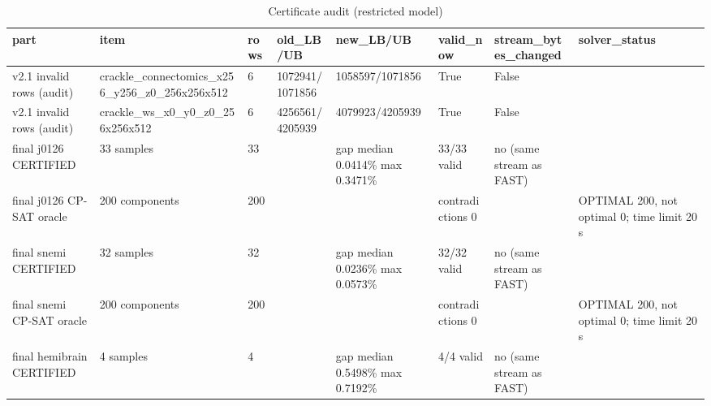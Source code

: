 \begin{table}[t]\centering\scriptsize
\caption{Certificate audit (restricted model)}\label{tab:T07}
\begin{tabular}{llllllll}
\hline
part & item & rows & old\_LB/UB & new\_LB/UB & valid\_now & stream\_bytes\_changed & solver\_status \\ \hline
v2.1 invalid rows (audit) & crackle\_connectomics\_x256\_y256\_z0\_256x256x512 & 6 & 1072941/1071856 & 1058597/1071856 & True & False &  \\
v2.1 invalid rows (audit) & crackle\_ws\_x0\_y0\_z0\_256x256x512 & 6 & 4256561/4205939 & 4079923/4205939 & True & False &  \\
final j0126 CERTIFIED & 33 samples & 33 &  & gap median 0.0414\% max 0.3471\% & 33/33 valid & no (same stream as FAST) &  \\
final j0126 CP-SAT oracle & 200 components & 200 &  &  & contradictions 0 &  & OPTIMAL 200, not optimal 0; time limit 20 s \\
final snemi CERTIFIED & 32 samples & 32 &  & gap median 0.0236\% max 0.0573\% & 32/32 valid & no (same stream as FAST) &  \\
final snemi CP-SAT oracle & 200 components & 200 &  &  & contradictions 0 &  & OPTIMAL 200, not optimal 0; time limit 20 s \\
final hemibrain CERTIFIED & 4 samples & 4 &  & gap median 0.5498\% max 0.7192\% & 4/4 valid & no (same stream as FAST) &  \\
\hline
\end{tabular}
\end{table}
